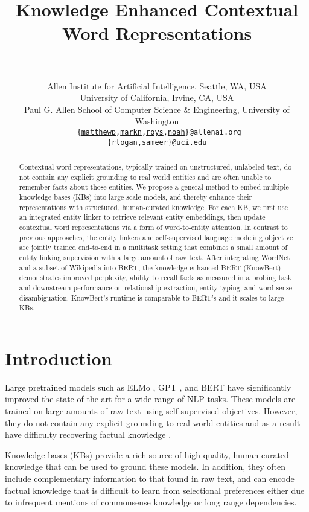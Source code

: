 \documentclass[11pt,a4paper]{article}
\title{Knowledge Enhanced Contextual Word Representations}
\author{\makecell{Matthew E. Peters, Mark Neumann, Robert L. Logan IV, Roy Schwartz,\\
Vidur Joshi, Sameer Singh, and Noah A. Smith}\\
\\
Allen Institute for Artificial Intelligence, Seattle, WA, USA\\
University of California, Irvine, CA, USA\\
Paul G. Allen School of Computer Science \& Engineering, University of Washington\\
\texttt{
    \hypersetup{urlcolor=black}
    \{\href{mailto:matthewp@allenai.org}{matthewp},\href{mailto:markn@allenai.org}{markn},\href{mailto:roys@allenai.org}{roys},\href{mailto:noah@allenai.org}{noah}\}@allenai.org}\\
    \texttt {
    \hypersetup{urlcolor=black}
    \{\href{mailto:rlogan@uci.edu}{rlogan},\href{mailto:sameer@uci.edu}{sameer}\}@uci.edu
    }
}
\date{}
\newcommand{\KB}[0]{KnowBert}
\begin{document}
\maketitle



\begin{abstract}
Contextual word representations, typically trained on unstructured, unlabeled text, do not contain any explicit grounding to real world entities and are often unable to remember facts about those entities.
We propose a general method to embed multiple knowledge bases (KBs) into large scale models, and thereby enhance their representations with structured, human-curated knowledge.
For each KB, we first use an integrated entity linker to retrieve relevant entity embeddings, then update contextual word representations via a form of word-to-entity attention.
In contrast to previous approaches, the entity linkers and self-supervised language modeling objective are jointly trained end-to-end in a multitask setting that combines a small amount of entity linking supervision with a large amount of raw text.
After integrating WordNet and a subset of Wikipedia into BERT, the knowledge enhanced BERT (\KB) demonstrates improved perplexity, ability to recall facts as measured in a probing task and downstream performance on relationship extraction, entity typing, and word sense disambiguation.
\KB's runtime is comparable to BERT's and it scales to large KBs.
\end{abstract}




\section{Introduction}

Large pretrained models such as ELMo \cite{Peters2018}, GPT \cite{Radford2018}, and BERT \cite{Devlin2018} have significantly improved the state of the art for a wide range of NLP tasks.
These models are trained on large amounts of raw text using self-supervised objectives.
However, they do not contain any explicit grounding to real world entities and as a result have difficulty recovering factual knowledge \cite{Logan2019BaracksWH}.

Knowledge bases (KBs) provide a rich source of high quality, human-curated knowledge that can be used to ground these models.
In addition, they often include complementary information to that found in raw text, and can 
encode factual knowledge that is difficult to learn from selectional preferences either due to infrequent mentions of commonsense knowledge or long range dependencies.
\end{document}

